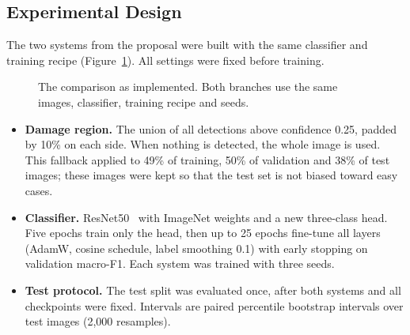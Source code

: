 \documentclass[11pt]{article}
\begin{document}
\subsection{Experimental Design}

The two systems from the proposal were built with the same classifier and training recipe (Figure~\ref{fig:pipe}). All settings were fixed before training.

\begin{figure}[!htbp]
\centering
{}
\caption{The comparison as implemented. Both branches use the same images, classifier, training recipe and seeds.}
\label{fig:pipe}
\end{figure}

\begin{itemize}
  \item \textbf{Damage region.} The union of all detections above confidence 0.25, padded by 10\% on each side. When nothing is detected, the whole image is used. This fallback applied to 49\% of training, 50\% of validation and 38\% of test images; these images were kept so that the test set is not biased toward easy cases.
  \item \textbf{Classifier.} ResNet50~\cite{resnet} with ImageNet weights and a new three-class head. Five epochs train only the head, then up to 25 epochs fine-tune all layers (AdamW, cosine schedule, label smoothing 0.1) with early stopping on validation macro-F1. Each system was trained with three seeds.
  \item \textbf{Test protocol.} The test split was evaluated once, after both systems and all checkpoints were fixed. Intervals are paired percentile bootstrap intervals over test images (2,000 resamples).
\end{itemize}
\end{document}
